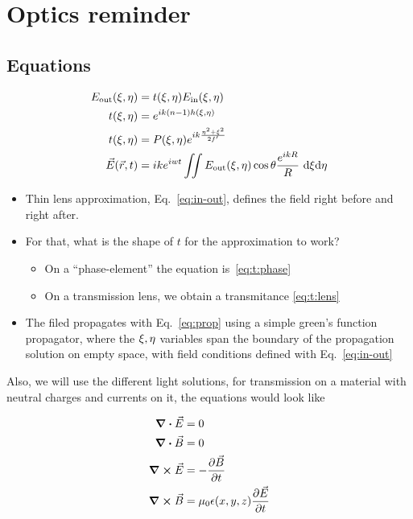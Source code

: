 \documentclass[../main/main.tex]{subfiles}
\begin{document}
\chapter{Optics reminder}

\section{Equations}

\begin{align}
E_{\textrm{out}}(\xi, \eta) &= t (\xi, \eta) E_{\textrm{in}}(\xi, \eta) \label{eq:in-out}\\
t (\xi, \eta) &=e^{i k (n - 1 ) h (\xi, \eta)}  \label{eq:t:phase} \\
t (\xi, \eta) &= P(\xi, \eta) e^{i k \frac{\eta^{2} + \xi^{2}}{2 f'}}  \label{eq:t:lens} \\
\vec{E}(\vec{r}, t) &= ik e ^{iwt} \iint E_{\textrm{out}}(\xi, \eta) \cos \theta \frac {e ^{i k R}} {R}\ \dd  \xi \dd \eta  \label{eq:prop}
\end{align}

\begin{itemize}
	\item Thin lens approximation, Eq.~\ref{eq:in-out}, defines the field right before and right after.
	\item For that, what is the shape of $t$ for the approximation to work?
	\begin{itemize}
		\item On a ``phase-element'' the equation is~\ref{eq:t:phase}
		\item On a transmission lens, we obtain a transmitance \ref{eq:t:lens}
	\end{itemize}
	\item The filed propagates with Eq.~\ref{eq:prop} using a simple green's function propagator, where the $\xi, \eta$ variables span the boundary of the propagation solution on empty space, with field conditions defined with Eq.~\ref{eq:in-out}

\end{itemize}



Also, we will use the different light solutions, for transmission on a material with neutral charges and currents on it, the equations would look like

\begin{align}
\div {\vec{E}} &= 0\\
\div {\vec{B}} &= 0\\
\curl {\vec{E}} &= -\pdv{\vec{B}}{t}\\
\curl {\vec{B}} &= \mu_{0} \epsilon(x,y,z)\pdv{\vec{E}}{t}
\end{align}
\end{document}
